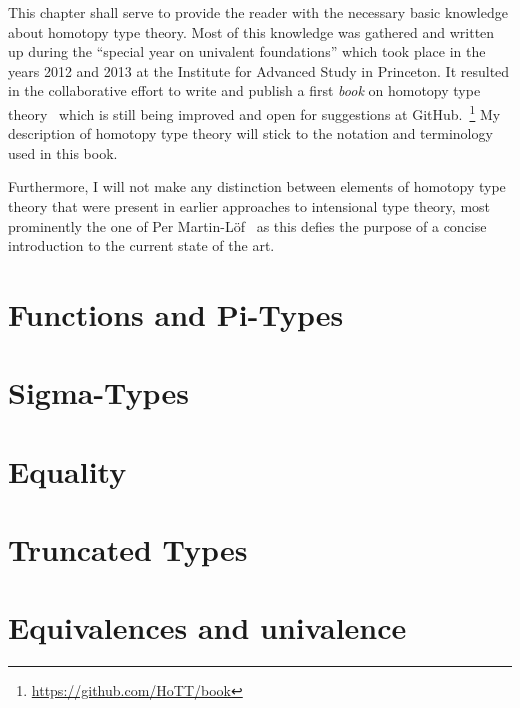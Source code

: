 This chapter shall serve to provide the reader with the necessary basic knowledge
about homotopy type theory.
Most of this knowledge was gathered and written up during the ``special year 
on univalent foundations'' which took place in the years 2012 and 2013
at the Institute for Advanced Study in Princeton.
It resulted in the collaborative effort to write and publish a first \emph{book}
on homotopy type theory~\cite{hottbook} which is still being improved and open
for suggestions at GitHub.~\footnote{\url{https://github.com/HoTT/book}}
My description of homotopy type theory will stick to the notation and terminology
used in this book.

Furthermore, I will not make any distinction between elements of homotopy type
theory that were present in earlier approaches to intensional type theory,
most prominently the one of Per Martin-L\"of~\cite{martin-lof1} as this
defies the purpose of a concise introduction to the current state of the art.


\section{Functions and Pi-Types}

\section{Sigma-Types}

\section{Equality}

\section{Truncated Types}

\section{Equivalences and univalence}
